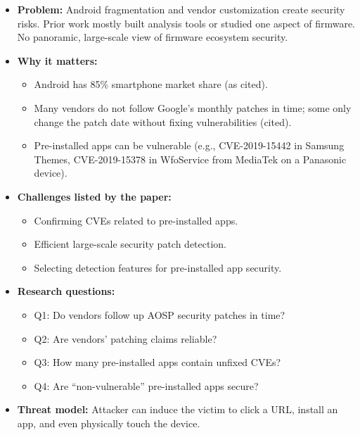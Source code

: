 \documentclass[11pt,a4paper]{article}
\begin{document}
\begin{enumerate}
    \begin{itemize}[leftmargin=*,itemsep=1pt,topsep=2pt]
        \item \textbf{Problem:} Android fragmentation and vendor customization create security risks. Prior work mostly built analysis tools or studied one aspect of firmware. No panoramic, large-scale view of firmware ecosystem security.
        \item \textbf{Why it matters:}
        \begin{itemize}[itemsep=0pt]
            \item Android has 85\% smartphone market share (as cited).
            \item Many vendors do not follow Google's monthly patches in time; some only change the patch date without fixing vulnerabilities (cited).
            \item Pre-installed apps can be vulnerable (e.g., CVE-2019-15442 in Samsung Themes, CVE-2019-15378 in WfoService from MediaTek on a Panasonic device).
        \end{itemize}
        \item \textbf{Challenges listed by the paper:}
        \begin{itemize}[itemsep=0pt]
            \item Confirming CVEs related to pre-installed apps.
            \item Efficient large-scale security patch detection.
            \item Selecting detection features for pre-installed app security.
        \end{itemize}
        \item \textbf{Research questions:}
        \begin{itemize}[itemsep=0pt]
            \item Q1: Do vendors follow up AOSP security patches in time?
            \item Q2: Are vendors' patching claims reliable?
            \item Q3: How many pre-installed apps contain unfixed CVEs?
            \item Q4: Are ``non-vulnerable'' pre-installed apps secure?
        \end{itemize}
        \item \textbf{Threat model:} Attacker can induce the victim to click a URL, install an app, and even physically touch the device.
    \end{itemize}


\end{enumerate}
\end{document}
